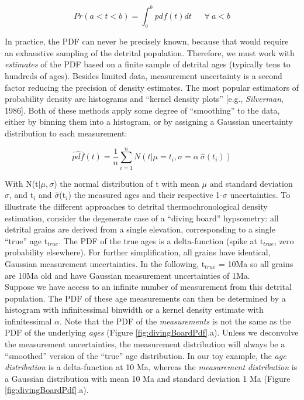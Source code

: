 \documentclass[12pt,twoside]{article}
\begin{document}
\begin{equation}
  \label{eq:pdf}
  Pr(a<t<b) = \int^b_a pdf(t) dt ~~~~~~~ \forall ~ a < b
\end{equation}

In practice, the PDF can  never be precisely known, because that would
require an exhaustive sampling of the detrital population.  Therefore,
we must work with {\it estimates}  of the PDF based on a finite sample
of  detrital  ages (typically  tens  to  hundreds  of ages).   Besides
limited data, measurement uncertainty  is a second factor reducing the
precision  of  density  estimates.   The most  popular  estimators  of
probability density are histograms and ``kernel density plots'' [e.g.,
{\it Silverman},  1986].  Both of  these methods apply some  degree of
``smoothing'' to the data, either by binning them into a histogram, or
by assigning a Gaussian uncertainty distribution to each measurement:

\begin{equation}
  \label{eq:pdfhat}
  \widehat{pdf}(t) = \frac{1}{n}\sum_{i=1}^{n}N (t|\mu = t_i, \sigma =
\alpha~\hat{\sigma}(t_i))
\end{equation}

With N(t$\mid\mu,\sigma$) the normal distribution of t with mean $\mu$
and standard  deviation $\sigma$, and  t$_i$ and $\hat{\sigma}$(t$_i$)
the measured  ages and their respective  1-$\sigma$ uncertainties.  To
illustrate  the different  approaches to  detrital thermochronological
density estimation, consider the degenerate case of a ``diving board''
hypsometry: all  detrital grains are derived from  a single elevation,
corresponding to a single ``true'' age t$_{true}$. The PDF of the true
ages  is  a  delta-function  (spike at  t$_{true}$,  zero  probability
elsewhere).   For further simplification,  all grains  have identical,
Gaussian  measurement uncertainties.  In  the following,  t$_{true}$ =
10Ma  so  all  grains  are  10Ma old  and  have  Gaussian  measurement
uncertainties of 1Ma.
\\

Suppose we have access to  an infinite number of measurement from this
detrital population.   The PDF of  these age measurements can  then be
determined  by a histogram  with infinitessimal  binwidth or  a kernel
density estimate  with infinitessimal $\alpha$.  Note that  the PDF of
the {\it  measurements} is not the  same as the PDF  of the underlying
{\it ages} (Figure  \ref{fig:divingBoardPdf}.a).  Unless we deconvolve
the  measurement  uncertainties,  the  measurement  distribution  will
always be a ``smoothed'' version of the ``true'' age distribution.  In
our toy example, the {\it  age distribution} is a delta-function at 10
Ma,  whereas   the  {\it  measurement  distribution}   is  a  Gaussian
distribution  with mean  10 Ma  and  standard deviation  1 Ma  (Figure
\ref{fig:divingBoardPdf}.a).
\\
\end{document}
